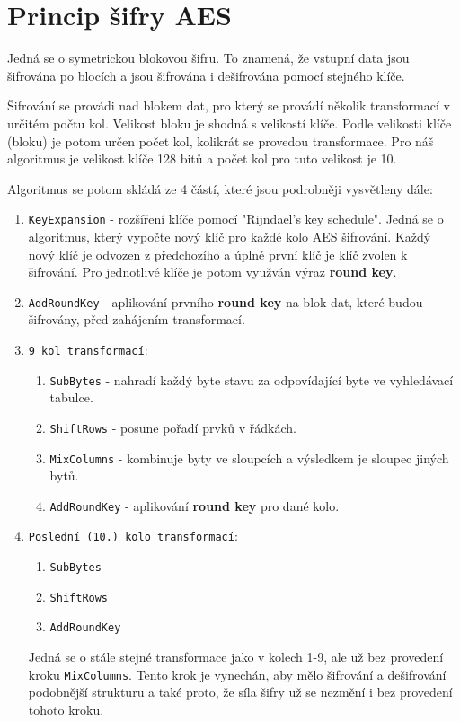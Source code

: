 \documentclass[12pt]{article}
\begin{document}
\section{Princip šifry AES}
Jedná se o symetrickou blokovou šifru. To znamená, že vstupní data jsou
šifrována po blocích a jsou šifrována i dešifrována pomocí stejného klíče.

Šifrování se provádi nad blokem dat, pro který se provádí několik transformací
v určitém počtu kol. Velikost bloku je shodná s velikostí klíče. Podle velikosti
klíče (bloku) je potom určen počet kol, kolikrát se provedou transformace. Pro
náš algoritmus je velikost klíče 128 bitů a počet kol pro tuto velikost je 10.

Algoritmus se potom skládá ze 4 částí, které jsou podrobněji vysvětleny dále:
\begin{enumerate}
	\item \texttt{KeyExpansion} - rozšíření klíče pomocí "Rijndael's key
		schedule". Jedná se o algoritmus, který vypočte nový klíč pro
		každé kolo AES šifrování. Každý nový klíč je odvozen z
		předchozího a úplně první klíč je klíč zvolen k šifrování.
		Pro jednotlivé klíče je potom využván výraz \textbf{round key}.
	\item \texttt{AddRoundKey} - aplikování prvního \textbf{round key} na
		blok dat, které budou šifrovány, před zahájením transformací.
	\item \texttt{9 kol transformací}:
		\begin{enumerate}
			\item \texttt{SubBytes} - nahradí každý byte stavu za 
				odpovídající byte ve vyhledávací tabulce.
			\item \texttt{ShiftRows} - posune pořadí prvků v
				řádkách.
			\item \texttt{MixColumns} - kombinuje byty ve sloupcích
				a výsledkem je sloupec jiných bytů.
			\item \texttt{AddRoundKey} - aplikování 
				\textbf{round key} pro dané kolo.
		\end{enumerate}
	\item \texttt{Poslední (10.) kolo transformací}:
		\begin{enumerate}
			\item \texttt{SubBytes}	
			\item \texttt{ShiftRows}
			\item \texttt{AddRoundKey}
		\end{enumerate}
		Jedná se o stále stejné transformace jako v kolech 1-9, ale už
		bez provedení kroku \texttt{MixColumns}. Tento krok je
		vynechán, aby mělo šifrování a dešifrování podobnější
		strukturu a také proto, že síla šifry už se nezmění i bez
		provedení tohoto kroku.
\end{enumerate}
%
\end{document}
